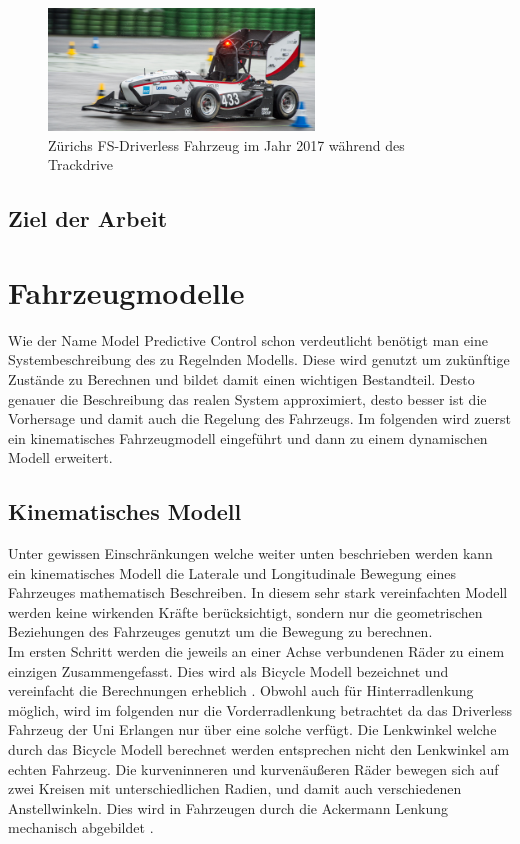 \documentclass{like}
\begin{document}
\begin{figure}[hb!]
	\caption{Zürichs FS-Driverless Fahrzeug im Jahr 2017 während des Trackdrive}
	\includegraphics[width=200pt]{Abbildungen/amz-driverless-long.jpg}
\end{figure}

\section{Ziel der Arbeit}


\chapter{Fahrzeugmodelle}

Wie der Name Model Predictive Control schon verdeutlicht benötigt man eine Systembeschreibung des zu Regelnden Modells. Diese wird genutzt um zukünftige Zustände zu Berechnen und bildet damit einen wichtigen Bestandteil. Desto genauer die Beschreibung das realen System approximiert, desto besser ist die Vorhersage und damit auch die Regelung des Fahrzeugs.
Im folgenden wird zuerst ein kinematisches Fahrzeugmodell eingeführt und dann zu einem dynamischen Modell erweitert.   

\section{Kinematisches Modell}
Unter gewissen Einschränkungen welche weiter unten beschrieben werden kann ein kinematisches Modell die Laterale und Longitudinale Bewegung eines Fahrzeuges mathematisch Beschreiben. In diesem sehr stark vereinfachten Modell werden keine wirkenden Kräfte berücksichtigt, sondern nur die geometrischen Beziehungen des Fahrzeuges genutzt um die Bewegung zu berechnen. \\
Im ersten Schritt werden die jeweils an einer Achse verbundenen Räder zu einem einzigen Zusammengefasst. Dies wird als Bicycle Modell bezeichnet und vereinfacht die Berechnungen erheblich \cite{BicycleModel}. Obwohl auch für Hinterradlenkung möglich, wird im folgenden nur die Vorderradlenkung betrachtet da das Driverless Fahrzeug der Uni Erlangen nur über eine solche verfügt. Die Lenkwinkel welche durch das Bicycle Modell berechnet werden entsprechen nicht den Lenkwinkel am echten Fahrzeug. Die kurveninneren und kurvenäußeren Räder bewegen sich auf zwei Kreisen mit unterschiedlichen Radien, und damit auch verschiedenen Anstellwinkeln. Dies wird in Fahrzeugen durch die Ackermann Lenkung mechanisch abgebildet \cite{rajamani2011vehicle}.
\end{document}
